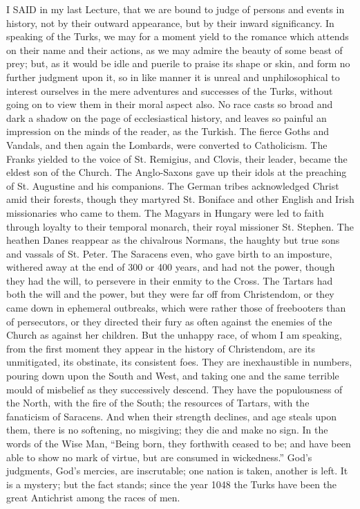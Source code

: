 I SAID
in my last Lecture, that we are bound to judge of persons and events
in history, not by their outward appearance, but by their inward
significancy. In speaking of the Turks, we may for a moment yield to
the romance which attends on their name and their actions, as we may
admire the beauty of some beast of prey; but, as it would be idle and
puerile to praise its shape or skin, and form no further judgment upon
it, so in like manner it is unreal and unphilosophical to interest
ourselves in the mere adventures and successes of the Turks, without
going on to view them in their moral aspect also. No race casts so
broad and dark a shadow on the page of ecclesiastical history, and
leaves so painful an impression on the minds of the reader, as the
Turkish. The fierce Goths and Vandals, and then again the Lombards,
were converted to Catholicism. The Franks yielded to the voice of St.
Remigius, and Clovis, their leader, became the eldest son of the
Church. The Anglo-Saxons gave up their idols at the preaching of St.
Augustine and his companions. The German tribes acknowledged Christ
amid their forests, though they martyred St. Boniface and other
English and Irish missionaries who came to them. The Magyars in
Hungary were led to faith through loyalty to their temporal monarch,
their royal missioner St. Stephen. The heathen Danes reappear as the
chivalrous Normans, the haughty but true sons and vassals of St.
Peter. The Saracens even, who gave birth to an imposture, withered
away at the end of 300 or 400 years, and had not the power, though
they had the will, to persevere in their enmity to the Cross. The
Tartars had both the will and the power, but they were far off from
Christendom, or they came down in ephemeral outbreaks, which were
rather those of freebooters than of persecutors, or they directed
their fury as often against the enemies of the Church as against her
children. But the unhappy race, of whom I am speaking, from the first
moment they appear in the history of Christendom, are its unmitigated,
its obstinate, its consistent foes. They are inexhaustible in numbers,
pouring down upon the South and West, and taking one and the same
terrible mould of misbelief as they successively descend. They have
the populousness of the North, with the fire of the South; the
resources of Tartars, with the fanaticism of Saracens. And when their
strength declines, and age steals upon them, there is no softening, no
misgiving; they die and make no sign. In the words of the Wise Man, ``Being
born, they forthwith ceased to be; and have been able to show no mark
of virtue, but are consumed in wickedness.'' God's judgments, God's
mercies, are inscrutable; one nation is taken, another is left. It is
a mystery; but the fact stands; since the year 1048 the Turks have
been the great Antichrist among the races of men.

